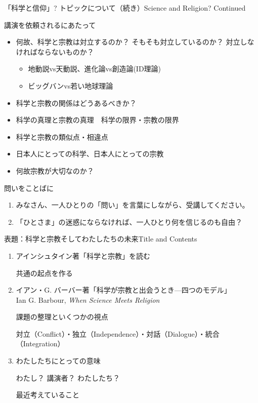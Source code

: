 \documentclass[10pt, dvipdfmx]{beamer}
\begin{document}
\begin{frame}{「科学と信仰」? トピックについて（続き）}{Science and Religion? \hfill Continued}

\begin{exampleblock}{講演を依頼されるにあたって}
\begin{itemize}
\item 何故、科学と宗教は対立するのか？ そもそも対立しているのか？ 対立しなければならないものか？
\begin{itemize}
\item 地動説vs天動説、進化論vs創造論(ID理論)
\item ビッグバンvs若い地球理論
\end{itemize}
\item 科学と宗教の関係はどうあるべきか？
\item 科学の真理と宗教の真理　科学の限界・宗教の限界
\item 科学と宗教の類似点・相違点
\item 日本人にとっての科学、日本人にとっての宗教
\item 何故宗教が大切なのか？
\end{itemize}
\end{exampleblock}

\begin{alertblock}{問いをことばに}
\begin{enumerate}
\item みなさん、一人ひとりの「問い」を言葉にしながら、受講してください。
\item 「ひとさま」の迷惑にならなければ、一人ひとり何を信じるのも自由？
\end{enumerate}
\end{alertblock}
\end{frame}

\begin{frame}{表題：科学と宗教そしてわたしたちの未来}{Title and Contents}
\begin{enumerate}
\item アインシュタイン著「科学と宗教」を読む \par
共通の起点を作る

\bigskip
\item イアン・G. バーバー著「科学が宗教と出会うとき—四つのモデル」\\
Ian G. Barbour, {\it When Science Meets Religion}\par
課題の整理といくつかの視点\par
対立（Conflict）・独立（Independence）・対話（Dialogue）・統合（Integration）

\bigskip
\item わたしたちにとっての意味\par
わたし？ 講演者？ わたしたち？ \par
最近考えていること
\end{enumerate}

\end{frame}
\end{document}
